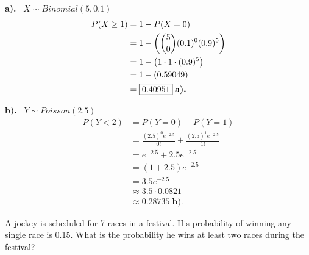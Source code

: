 \documentclass[a4paper, 10pt]{article}
\begin{document}
\begin{solution}
\par\noindent\textbf{a).} \, \( X \sim Binomial(5, 0.1) \)
\begin{align*}
    P(X \geq 1) &= 1 - P(X = 0) \\
    &= 1 - \left(\binom{5}{0} (0.1)^0 (0.9)^5\right) \\
    &= 1 - \left(1 \cdot 1 \cdot (0.9)^5\right) \\
    &= 1 - (0.59049) \\
    &= \boxed{0.40951} \; \textbf{a).}
\end{align*}

\vspace{2mm}

\par\noindent\textbf{b).} \, \( Y \sim Poisson(2.5) \)
\begin{align*}
    P(Y < 2) &= P(Y = 0) + P(Y = 1) \\
    &= \frac{(2.5)^0 e^{-2.5}}{0!} + \frac{(2.5)^1 e^{-2.5}}{1!} \\
    &= e^{-2.5} + 2.5 e^{-2.5} \\
    &= (1 + 2.5) e^{-2.5} \\
    &= 3.5 e^{-2.5} \\
    &\approx 3.5 \cdot 0.0821 \\
    &\approx \boxed{0.28735} \; \textbf{b).}
\end{align*}
\end{solution}


\begin{problem}
A jockey is scheduled for 7 races in a festival. His probability of winning any single race is 0.15.
What is the probability he wins at least two races during the festival?
\end{problem}
\end{document}
